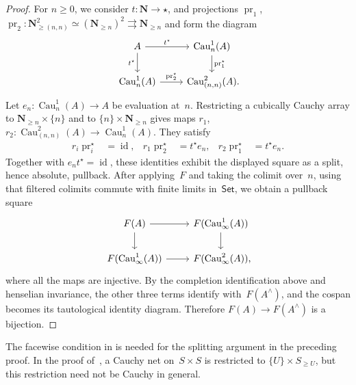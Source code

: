 \documentclass[11pt,a4paper]{amsart}
\newcommand{\cref}[1]{\zcref{#1}}
\numberwithin{equation}{section}
\theoremstyle{plain}
\theoremstyle{definition}
\theoremstyle{remark}
\newcommand{\NN}{\mathbf{N}}
\newcommand{\Cau}{\operatorname{Cau}}
\newcommand{\id}{\operatorname{id}}
\newcommand{\pr}{\operatorname{pr}}
\newcommand{\Cat}[1]{\mathsf{#1}}
\begin{document}
\begin{proof}
  For \(n\geq0\),
  we consider
  \(t\colon\NN\to\star\),
  and projections \(\pr_{1}\), \(\pr_{2}\colon\NN_{\geq(n,n)}^{2}
  \simeq(\NN_{\geq n})^{2}\rightrightarrows\NN_{\geq n}\)
  and form the diagram
  \begin{equation*}
    \begin{tikzcd}
      A\ar[d,"t^{\star}"']\ar[r,"t^{\star}"]&
      \Cau^{1}_{n}(A)\ar[d,"\pr_{1}^{\star}"]\\
      \Cau^{1}_{n}(A)\ar[r,"\pr_{2}^{\star}"]&
      \Cau^{2}_{(n,n)}(A)\rlap.
    \end{tikzcd}
  \end{equation*}
  Let \(e_n\colon\Cau^1_n(A)\to A\) be evaluation at~\(n\).
  Restricting a cubically Cauchy array to
  \(\NN_{\geq n}\times\{n\}\) and to
  \(\{n\}\times\NN_{\geq n}\) gives maps
  \(r_1\), \(r_2\colon\Cau^2_{(n,n)}(A)\to\Cau^1_n(A)\).
  They satisfy
  \begin{align*}
    r_i\pr_i^\star&=\id,&
    r_1\pr_2^\star&=t^\star e_n,&
    r_2\pr_1^\star&=t^\star e_n.
  \end{align*}
  Together with \(e_n t^\star=\id\), these identities exhibit the
  displayed square as a split, hence absolute, pullback.
  After applying~\(F\) and taking the colimit over~\(n\),
  using that filtered colimits commute with finite limits in~\(\Cat{Set}\),
  we obtain a pullback square
  \begin{equation*}
    \begin{tikzcd}
      F(A)\ar[d]\ar[r]&
      F(\Cau^{1}_{\infty}(A))\ar[d]\\
      F(\Cau^{1}_{\infty}(A))\ar[r]&
      F(\Cau^{2}_{\infty}(A))\rlap,
    \end{tikzcd}
  \end{equation*}
  where all the maps are injective.
  By the completion identification above and henselian invariance,
  the other three terms identify with~\(F(A^{\wedge})\),
  and the cospan becomes its tautological identity diagram.
  Therefore \(F(A)\to F(A^{\wedge})\) is a bijection.
\end{proof}

\begin{remark}\label{xxf2s8}
  The facewise condition in \cref{cauchy-rings} is needed
  for the splitting argument in the preceding proof.
  In the proof
  of~\cite[Theorem~2.1.15\,(b)]{BouthierCesnavicius22},
  a Cauchy net on~\(S\times S\) is restricted
  to \(\{U\}\times S_{\geq U}\),
  but this restriction need not be Cauchy in general.
\end{remark}
\end{document}

